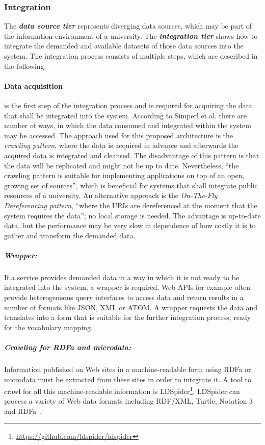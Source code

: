 \documentclass{article}
\begin{document}
\subsubsection{Integration}
\label{technical-architecture-challenges:proposal:integration}
The \textit{\textbf{data source tier}} represents diverging data sources, which may be part of the information environment of a university. The \textit{\textbf{integration tier}} shows how to integrate the demanded and available datasets of those data sources into the system. The integration process consists of multiple steps, which are described in the following.

\paragraph{Data acquisition} is the first step of the integration process and is required for acquiring the data that shall be integrated into the system. According to Simperl et.al.\cite{simperl_using_2013}\cite{heath_linked_2011} there are number of ways, in which the data consumed and integrated within the system may be accessed. The approach used for this proposed architecture is the \textit{crawling pattern}, where the data is acquired in advance and afterwards the acquired data is integrated and cleansed. The disadvantage of this pattern is that the data will be replicated and might not be up to date. Nevertheless, \enquote{the crawling pattern is suitable for implementing applications on top of an open, growing set of sources}\cite{heath_linked_2011}, which is beneficial for systems that shall integrate public resources of a university. An alternative approach is the \textit{On-The-Fly Dereferencing pattern}, \enquote{where the URIs are dereferenced at the moment that the system requires the data}; no local storage is needed. The advantage is up-to-date data, but the performance may be very slow in dependence of how costly it is to gather and transform the demanded data.

\subparagraph{Wrapper:} If a service provides demanded data in a way in which it is not ready to be integrated into the system, a wrapper is required. Web APIs for example often provide heterogeneous query interfaces to access data and return results in a number of formats like JSON, XML or ATOM. A wrapper requests the data and translates into a form that is suitable for the further integration process; ready for the vocabulary mapping.

\subparagraph{Crawling for RDFa and microdata:} Information published on Web sites in a machine-readable form using RDFa or microdata must be extracted from these sites in order to integrate it. A tool to crawl for all this machine-readable information is LDSpider\footnote{\url{https://github.com/ldspider/ldspider}}. LDSpider can process a variety of Web data formats including RDF/XML, Turtle, Notation 3 and RDFa~\cite{isele_ldspider:_2010}.
\end{document}

